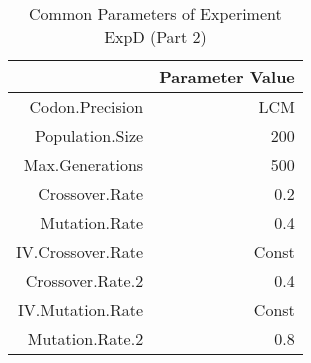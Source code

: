\begin{table}[ht]
\centering
\begin{tabular}{rr}
  \hline
 & Parameter Value \\ 
  \hline
Codon.Precision & LCM \\ 
  Population.Size & 200 \\ 
  Max.Generations & 500 \\ 
  Crossover.Rate & 0.2 \\ 
  Mutation.Rate & 0.4 \\ 
  IV.Crossover.Rate & Const \\ 
  Crossover.Rate.2 & 0.4 \\ 
  IV.Mutation.Rate & Const \\ 
  Mutation.Rate.2 & 0.8 \\ 
   \hline
\end{tabular}
\caption{Common Parameters of Experiment ExpD (Part 2)} 
\end{table}

